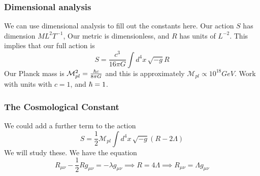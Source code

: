 \subsubsection{Dimensional analysis} 
We can use dimensional analysis to fill out the 
constants here. Our action $ S $ has dimension 
$ M L ^{ 2 } T ^{ - 1}  $, Our metric is dimensionless, and 
$ R $ has units of $ L ^{ - 2} $. This implies that 
our full action is 
\[
 S = \frac{ c ^ 3  }{  16 \pi G} \int d ^ 4 x \, \sqrt{ -g }  R
\]  Our Planck mass
is $ \mathcal{ M } _{ pl } ^ 2  = \frac{ \hbar c }{8 \pi G }$ and 
this is approximately $ \mathcal{ M } _{ pl } \propto 10 ^{ 18 } G eV $. 
Work with units with $ c = 1 $, and $ \hbar = 1 $. 

\subsubsection{The Cosmological Constant} 
We could add a further term to the action 
 \[
	 S = \frac{1}{2 } \mathcal{ M  }_{ pl } \int d ^ 4 x \, \sqrt{ - g}  ( R - 2 \Lambda ) 
\] We will study these. 
We have the equation 
\[
 R_{ \mu \nu } - \frac{1}{2 } R g _{ \mu \nu } = - \lambda g _{ \mu \nu } \implies 
 R = 4 \Lambda \implies R_{ \mu \nu }  = \Lambda g _{ \mu \nu }
\]

